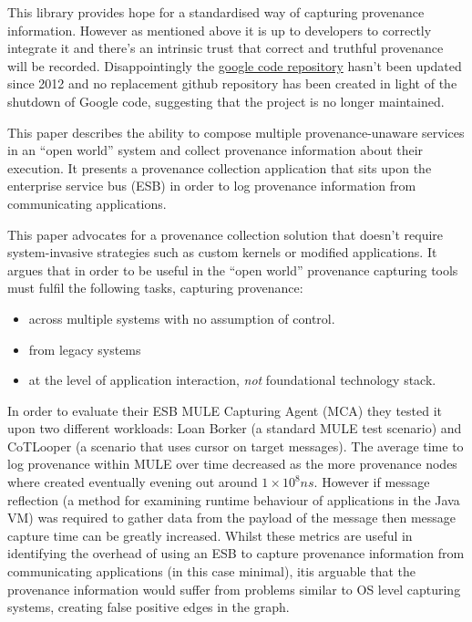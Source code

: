 This library provides hope for a standardised way of capturing provenance information. However as mentioned above it is up to developers to correctly integrate it and there's an intrinsic trust that correct and truthful provenance will be recorded. Disappointingly the \href{https://code.google.com/p/core-provenance-library/}{google code repository} hasn't been updated since 2012 and no replacement github repository has been created in light of the shutdown of Google code, suggesting that the project is no longer maintained.


This paper describes the ability to compose multiple provenance-unaware services in an ``open world'' system and collect provenance information about their execution. It presents a provenance collection application that sits upon the enterprise service bus (ESB) in order to log provenance information from communicating applications.

This paper advocates for a provenance collection solution that doesn't require system-invasive strategies such as custom kernels or modified applications. It argues that in order to be useful in the ``open world'' provenance capturing tools must fulfil the following tasks, capturing provenance:
\begin{itemize}
  \item across multiple systems with no assumption of control.
  \item from legacy systems
  \item at the level of application interaction, \textit{not} foundational technology stack.
\end{itemize}

In order to evaluate their ESB MULE Capturing Agent (MCA) they tested it upon two different workloads: Loan Borker (a standard MULE test scenario) and CoTLooper (a scenario that uses cursor on target messages). The average time to log provenance within MULE over time decreased as the more provenance nodes where created eventually evening out around $1 \times 10^8ns$. However if message reflection (a method for examining runtime behaviour of applications in the Java VM) was required to gather data from the payload of the message then message capture time can be greatly increased. Whilst these metrics are useful in identifying the overhead of using an ESB to capture provenance information from communicating applications (in this case minimal), itis arguable that the provenance information would suffer from problems similar to OS level capturing systems, creating false positive edges in the graph.


